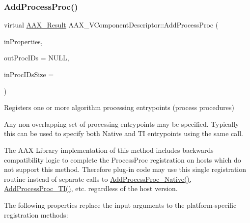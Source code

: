 \subsubsection{\texorpdfstring{AddProcessProc()}{AddProcessProc()}}
{\footnotesize\ttfamily virtual \mbox{\hyperlink{a00392_a4d8f69a697df7f70c3a8e9b8ee130d2f}{A\+A\+X\+\_\+\+Result}} A\+A\+X\+\_\+\+V\+Component\+Descriptor\+::\+Add\+Process\+Proc (\begin{DoxyParamCaption}\item[{\mbox{\hyperlink{a01869}{A\+A\+X\+\_\+\+I\+Property\+Map}} $\ast$}]{in\+Properties,  }\item[{\mbox{\hyperlink{a00392_aeaf9b387f902c50a8360ff423f4a1f23}{A\+A\+X\+\_\+\+C\+Selector}} $\ast$}]{out\+Proc\+I\+Ds = {\ttfamily NULL},  }\item[{int32\+\_\+t}]{in\+Proc\+I\+Ds\+Size = {} }\end{DoxyParamCaption})\hspace{0.3cm}{\ttfamily [virtual]}}



Registers one or more algorithm processing entrypoints (process procedures) 

Any non-\/overlapping set of processing entrypoints may be specified. Typically this can be used to specify both Native and TI entrypoints using the same call.

The A\+AX Library implementation of this method includes backwards compatibility logic to complete the Process\+Proc registration on hosts which do not support this method. Therefore plug-\/in code may use this single registration routine instead of separate calls to \mbox{\hyperlink{a01901_a21e758a4ad757e694c183548fe58f0f0}{Add\+Process\+Proc\+\_\+\+Native()}}, \mbox{\hyperlink{a01901_ad9957b836cf89a8f82dbb7eab9953fc5}{Add\+Process\+Proc\+\_\+\+T\+I()}}, etc. regardless of the host version.

The following properties replace the input arguments to the platform-\/specific registration methods\+:

